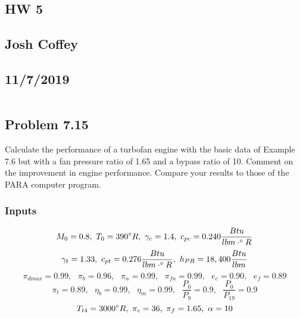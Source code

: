 \documentclass[preview,12pt]{article}
\begin{document}
\begin{center}
    \section*{HW 5}
    \subsection*{Josh Coffey}
    \subsection*{11/7/2019}
\end{center}

$$$$

\begin{center}
    \section*{Problem 7.15}
\end{center}
Calculate the performance of a turbofan engine with the basic data of Example 7.6 but with a fan pressure ratio of 1.65 and a bypass ratio of 10.  Comment on the improvement in engine performance.  Compare your results to those of the PARA computer program.

\subsubsection*{Inputs}
$$M_0=0.8,\textrm{ }T_0=390\degree R,\textrm{ }\gamma_c=1.4,\textrm{ }c_{pc}=0.240 \frac{Btu}{lbm \cdot \degree R}$$
$$\gamma_t=1.33,\textrm{ }c_{pt}=0.276 \frac{Btu}{lbm \cdot \degree R},\textrm{ }h_{PR}=18,400 \frac{Btu}{lbm}$$
$$\pi_{dmax}=0.99,\textrm{ }\pi_b=0.96,\textrm{ }\pi_n=0.99,\textrm{ }\pi_{fn}=0.99,\textrm{ }e_c=0.90,\textrm{ }e_f=0.89$$
$$\pi_t=0.89,\textrm{ }\eta_b=0.99,\textrm{ }\eta_m=0.99,\textrm{ }\frac{P_0}{P_9}=0.9,\textrm{ }\frac{P_0}{P_{19}}=0.9$$
$$T_{t4}=3000 \degree R,\textrm{ }\pi_c=36,\textrm{ }\pi_f=1.65,\textrm{ }\alpha=10$$
\end{document}
